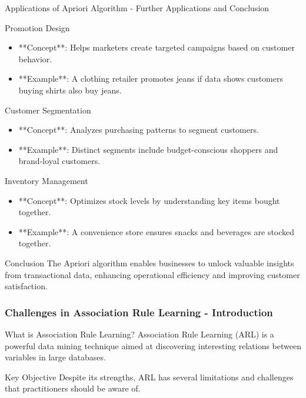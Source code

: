 \documentclass[aspectratio=169]{beamer}
\begin{document}
\begin{frame}[fragile]{Applications of Apriori Algorithm - Further Applications and Conclusion}
  \begin{block}{Promotion Design}
    \begin{itemize}
      \item **Concept**: Helps marketers create targeted campaigns based on customer behavior.
      \item **Example**: A clothing retailer promotes jeans if data shows customers buying shirts also buy jeans.
    \end{itemize}
  \end{block}

  \begin{block}{Customer Segmentation}
    \begin{itemize}
      \item **Concept**: Analyzes purchasing patterns to segment customers.
      \item **Example**: Distinct segments include budget-conscious shoppers and brand-loyal customers.
    \end{itemize}
  \end{block}

  \begin{block}{Inventory Management}
    \begin{itemize}
      \item **Concept**: Optimizes stock levels by understanding key items bought together.
      \item **Example**: A convenience store ensures snacks and beverages are stocked together.
    \end{itemize}
  \end{block}

  \begin{block}{Conclusion}
    The Apriori algorithm enables businesses to unlock valuable insights from transactional data, enhancing operational efficiency and improving customer satisfaction.
  \end{block}
\end{frame}

\begin{frame}[fragile]
    \frametitle{Challenges in Association Rule Learning - Introduction}
    \begin{block}{What is Association Rule Learning?}
        Association Rule Learning (ARL) is a powerful data mining technique aimed at discovering interesting relations between variables in large databases. 
    \end{block}
    \begin{block}{Key Objective}
        Despite its strengths, ARL has several limitations and challenges that practitioners should be aware of.
    \end{block}
\end{frame}
\end{document}

